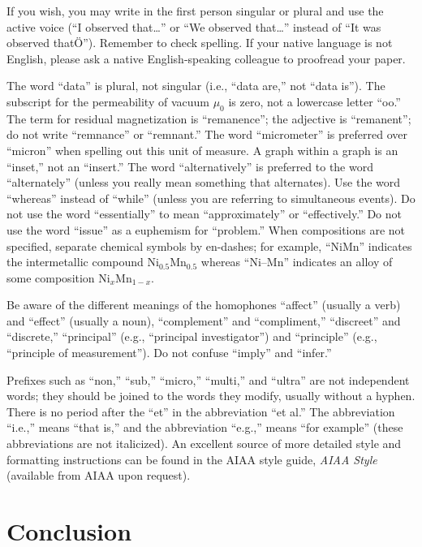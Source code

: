 If you wish, you may write in the first person singular or plural and
use the active voice (``I observed that\ldots'' or ``We observed that\ldots''
instead of ``It was observed thatÖ'').
Remember to check spelling.
If your native language is not English, please ask a native
English-speaking colleague to proofread your paper.

The word ``data'' is plural, not singular (i.e., ``data are,'' not ``data
is'').
The subscript for the permeability of vacuum $\mu_0$ is zero, not a
lowercase letter ``oo.''
The term for residual magnetization is ``remanence''; the adjective is
``remanent''; do not write ``remnance'' or ``remnant.''
The word ``micrometer'' is preferred over ``micron'' when spelling out
this unit of measure.
A graph within a graph is an ``inset,'' not an ``insert.''
The word ``alternatively'' is preferred to the word ``alternately''
(unless you really mean something that alternates).
Use the word ``whereas'' instead of ``while'' (unless you are referring
to simultaneous events).
Do not use the word ``essentially'' to mean ``approximately'' or
``effectively.''
Do not use the word ``issue'' as a euphemism for ``problem.''
When compositions are not specified, separate chemical symbols by
en-dashes; for example, ``NiMn'' indicates the intermetallic compound
Ni$_{0.5}$Mn$_{0.5}$ whereas ``Ni--Mn'' indicates an alloy of some
composition Ni$_{x}$Mn$_{1-x}$.

Be aware of the different meanings of the homophones ``affect'' (usually
a verb) and ``effect'' (usually a noun), ``complement'' and
``compliment,'' ``discreet'' and ``discrete,'' ``principal'' (e.g.,
``principal investigator'') and ``principle'' (e.g., ``principle of
measurement''). Do not confuse ``imply'' and ``infer.''

Prefixes such as ``non,'' ``sub,'' ``micro,'' ``multi,'' and ``ultra''
are not independent words; they should be joined to the words they
modify, usually without a hyphen.
There is no period after the ``et'' in the abbreviation ``et al.''
The abbreviation ``i.e.,'' means ``that is,'' and the abbreviation
``e.g.,'' means ``for example'' (these abbreviations are not
italicized).
An excellent source of more detailed style and formatting instructions
can be found in the AIAA style guide, {\it AIAA Style} (available from AIAA
upon request).

\section{Conclusion}

